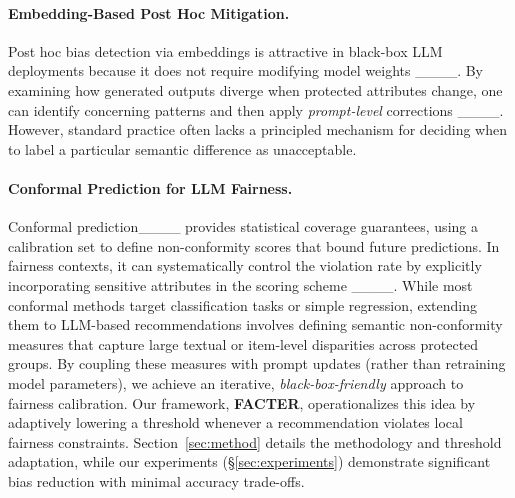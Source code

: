 \vspace{-1em}
\paragraph{Embedding-Based Post Hoc Mitigation.}
Post hoc bias detection via embeddings is attractive in black-box LLM deployments because it does not require modifying model weights ____. By examining how generated outputs diverge when protected attributes change, one can identify concerning patterns and then apply \emph{prompt-level} corrections ____. However, standard practice often lacks a principled mechanism for deciding when to label a particular semantic difference as unacceptable.

\vspace{-1em}
\paragraph{Conformal Prediction for LLM Fairness.}
Conformal prediction____ provides statistical coverage guarantees, using a calibration set to define non-conformity scores that bound future predictions. In fairness contexts, it can systematically control the violation rate by explicitly incorporating sensitive attributes in the scoring scheme ____. While most conformal methods target classification tasks or simple regression, extending them to LLM-based recommendations involves defining semantic non-conformity measures that capture large textual or item-level disparities across protected groups. By coupling these measures with prompt updates (rather than retraining model parameters), we achieve an iterative, \emph{black-box-friendly} approach to fairness calibration. Our framework, \textbf{FACTER}, operationalizes this idea by adaptively lowering a threshold whenever a recommendation violates local fairness constraints. Section~\ref{sec:method} details the methodology and threshold adaptation, while our experiments (\S\ref{sec:experiments}) demonstrate significant bias reduction with minimal accuracy trade-offs.